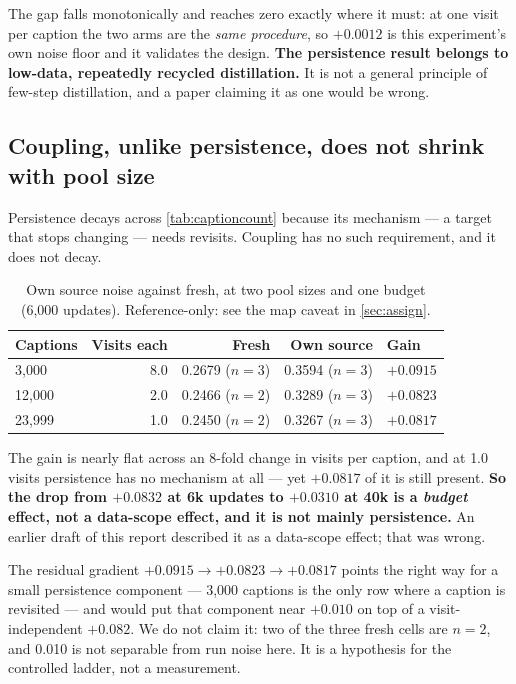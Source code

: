 \documentclass[11pt]{article}
\newcommand{\obs}[1]{\textcolor{obsblue}{#1}}
\begin{document}
The gap falls monotonically and reaches zero exactly where it must: at one visit per caption the two
arms are the \emph{same procedure}, so \obs{$+0.0012$} is this experiment's own noise floor and it
validates the design. \textbf{The persistence result belongs to low-data, repeatedly recycled
distillation.} It is not a general principle of few-step distillation, and a paper claiming it as one
would be wrong.

\subsection{Coupling, unlike persistence, does not shrink with pool size}

Persistence decays across \cref{tab:captioncount} because its mechanism --- a target that stops
changing --- needs revisits. Coupling has no such requirement, and it does not decay.

\begin{table}[h]
\centering
\caption{Own source noise against fresh, at two pool sizes and one budget
(\obs{6{,}000} updates). Reference-only: see the map caveat in \cref{sec:assign}.}
\label{tab:couplingscope}
\small
\begin{tabular}{@{}lrrrl@{}}
\toprule
Captions & Visits each & Fresh & Own source & Gain \\
\midrule
\obs{3{,}000}  & \obs{8.0} & \obs{0.2679} ($n{=}3$) & \obs{0.3594} ($n{=}3$) & \obs{$+0.0915$} \\
\obs{12{,}000} & \obs{2.0} & \obs{0.2466} ($n{=}2$) & \obs{0.3289} ($n{=}3$) & \obs{$+0.0823$} \\
\obs{23{,}999} & \obs{1.0} & \obs{0.2450} ($n{=}2$) & \obs{0.3267} ($n{=}3$) & \obs{$+0.0817$} \\
\bottomrule
\end{tabular}
\end{table}

The gain is nearly flat across an \obs{8}-fold change in visits per caption, and at \obs{1.0} visits
persistence has no mechanism at all --- yet \obs{$+0.0817$} of it is still present. \textbf{So the
drop from \obs{$+0.0832$} at \obs{6}k updates to \obs{$+0.0310$} at \obs{40}k is a \emph{budget}
effect, not a data-scope effect, and it is not mainly persistence.} An earlier draft of this report
described it as a data-scope effect; that was wrong.

The residual gradient \obs{$+0.0915\to+0.0823\to+0.0817$} points the right way for a small
persistence component --- \obs{3{,}000} captions is the only row where a caption is revisited --- and
would put that component near \obs{$+0.010$} on top of a visit-independent \obs{$+0.082$}. We do not
claim it: two of the three fresh cells are $n{=}2$, and \obs{0.010} is not separable from run noise
here. It is a hypothesis for the controlled ladder, not a measurement.
\end{document}
